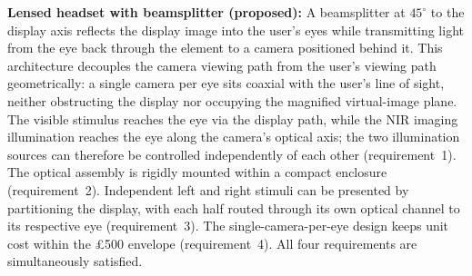 \textbf{Lensed headset with beamsplitter (proposed):} A beamsplitter at $45^{\circ}$ to the display axis reflects the display image into the user's eyes while transmitting light from the eye back through the element to a camera positioned behind it. This architecture decouples the camera viewing path from the user's viewing path geometrically: a single camera per eye sits coaxial with the user's line of sight, neither obstructing the display nor occupying the magnified virtual-image plane. The visible stimulus reaches the eye via the display path, while the NIR imaging illumination reaches the eye along the camera's optical axis; the two illumination sources can therefore be controlled independently of each other (requirement~1). The optical assembly is rigidly mounted within a compact enclosure (requirement~2). Independent left and right stimuli can be presented by partitioning the display, with each half routed through its own optical channel to its respective eye (requirement~3). The single-camera-per-eye design keeps unit cost within the \pounds 500 envelope (requirement~4). All four requirements are simultaneously satisfied.

